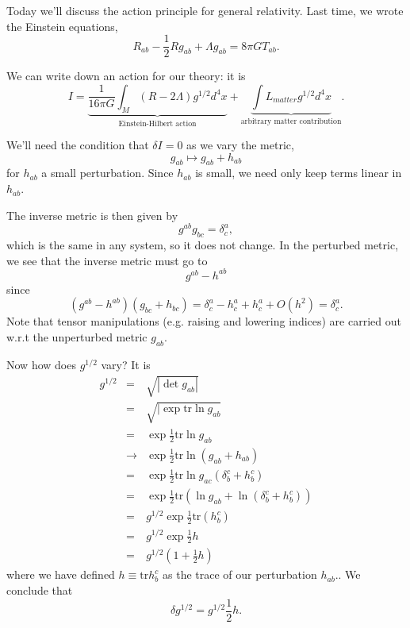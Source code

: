 Today we'll discuss the action principle for general relativity. Last time, we wrote the Einstein equations,
$$R_{ab}-\frac{1}{2}Rg_{ab}+\Lambda g_{ab}=8\pi GT_{ab}.$$

We can write down an action for our theory: it is
$$I=\underbrace{\frac{1}{16\pi G}\int_M (R-2\Lambda)g^{1/2}d^4x}_{\text{Einstein-Hilbert action}} + \underbrace{\int L_{matter} g^{1/2}d^4x}_{\text{arbitrary matter contribution}}.$$

We'll need the condition that $\delta I=0$ as we vary the metric,
$$g_{ab}\mapsto g_{ab}+h_{ab}$$ for $h_{ab}$ a small perturbation. Since $h_{ab}$ is small, we need only keep terms linear in $h_{ab}$. 

The inverse metric is then given by
$$g^{ab} g_{bc}=\delta^a_c,$$ which is the same in any system, so it does not change. In the perturbed metric, we see that the inverse metric must go to 
$$g^{ab}-h^{ab}$$ since
$$(g^{ab}-h^{ab})(g_{bc}+h_{bc})=\delta^a_c -h^a_c+h^a_c+O(h^2)=\delta^a_c.$$
Note that tensor manipulations (e.g. raising and lowering indices) are carried out w.r.t the unperturbed metric $g_{ab}$.

Now how does $g^{1/2}$ vary? It is
\begin{eqnarray*}
g^{1/2}&=& \sqrt{|\det g_{ab}|}\\
&=&\sqrt{|\exp \text{tr}\ln g_{ab}}\\
&=&\exp \frac{1}{2} \text{tr}\ln g_{ab}\\
&\to& \exp \frac{1}{2}\text{tr}\ln (g_{ab}+h_{ab})\\
&=&\exp \frac{1}{2} \text{tr} \ln g_{ac} (\delta^c_b + h^c_b)\\
&=&\exp \frac{1}{2}\text{tr}(\ln g_{ab}+\ln (\delta^c_b +h^c_b))\\
&=& g^{1/2} \exp \frac{1}{2} \text{tr}(h^c_b)\\
&=&g^{1/2} \exp \frac{1}{2} h\\
&=&g^{1/2} \left(1+\frac{1}{2}h\right)
\end{eqnarray*}
where we have defined $h\equiv \text{tr} h^c_b$ as the trace of our perturbation $h_{ab}.$. We conclude that
$$\delta g^{1/2}=g^{1/2}\frac{1}{2}h.$$

